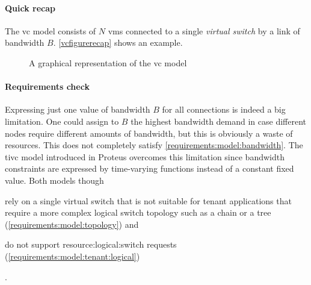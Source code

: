 \paragraph{Quick recap}
The \gls{vc} model consists of $N$ \glspl{vm} connected to a single \textit{virtual switch} by a link of bandwidth $B$.
\autoref{vcfigurerecap} shows an example.

\begin{figure}[!htb]
    \centering
    \usebox{\vcfigure}
    \caption{A graphical representation of the \gls{vc} model}
    \label{vcfigurerecap}
\end{figure}

\paragraph{Requirements check}
Expressing just one value of bandwidth $B$ for all connections is indeed a big limitation.
One could assign to $B$ the highest bandwidth demand in case different nodes require different amounts of bandwidth, but this is obviously a waste of resources.
This does not completely satisfy \xmark \ref{requirements:model:bandwidth}.
The \gls{tivc} model introduced in Proteus \cite{proteus} overcomes this limitation since bandwidth constraints are expressed by time-varying functions instead of a constant fixed value.
Both models though 
\begin{mylist}
    \item rely on a single virtual switch that is not suitable for tenant applications that require a more complex logical switch topology such as a chain or a tree (\xmark \ref{requirements:model:topology}) and
    \item do not support \gls{resource:logical:switch} requests (\xmark \ref{requirements:model:tenant:logical})
\end{mylist}.

\begin{comment}
    \paragraph{A possible modification}
    Since specifying the same bandwidth demand $B$ for all \glspl{vm} is restrictive, one trivial solution could consist in allowing the model to specify different values of $B$, like depicted in \autoref{fig:vcmod}.
    
    \begin{figure}[!htb]
        \centering
        \usebox{\vcmodfigure}
        \caption{A possible \gls{vc} variant}
        \label{fig:vcmod}
    \end{figure}
    
    Still, the one-level tree topology remains a problem for those applications which require a more complex logical switch topology: regarding this, a natural \gls{vc} extension is the \gls{voc} model, hence leaving aside the former model in favor of the latter one.
\end{comment}